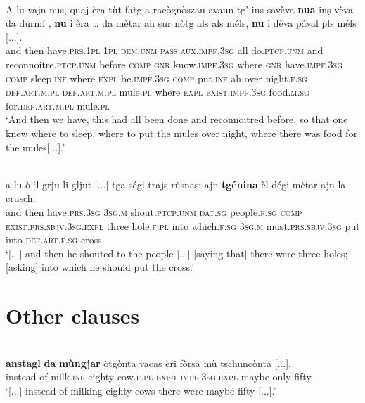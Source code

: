 	
\ea
\label{}
\\
\gll A lu vajn nus, quaj èra tùt fatg a racògnòszau avaun tg’ ins savèva \textbf{nua} inṣ vèva da durmí , \textbf{nu} i èra … da mètar ah ṣur nòtg als als méls, \textbf{nu} i dèva pával pls méls [...]. \\
and then have.\textsc{prs.1pl} \textsc{1pl} \textsc{dem.unm} \textsc{pass.aux.impf.3sg} all do.\textsc{ptcp.unm} and  reconnoitre.\textsc{ptcp.unm} before \textsc{comp} \textsc{gnr}  know.\textsc{impf.3sg} where \textsc{gnr} have.\textsc{impf.3sg} \textsc{comp} sleep.\textsc{inf} where \textsc{expl} be.\textsc{impf.3sg} {} \textsc{comp} put.\textsc{inf} ah over night.\textsc{f.sg} \textsc{def.art.m.pl} \textsc{def.art.m.pl} mule.\textsc{pl} where \textsc{expl} \textsc{exist.impf.3sg} food.\textsc{m.sg} for.\textsc{def.art.m.pl} mule.\textsc{pl}\\
\glt `And then we have, this had all been done and reconnoitred before, so that one knew where to sleep, where to put the mules over night, where there was food for the mules[...].'
\z

\ea
\label{}
 {\citealt[134]{Büchli1966}}\\
\gll [...] a lu ò `l grju li gljut [...] tga ségi trajs rùsnas; ajn \textbf{tgénina} èl dégi mètar ajn la crusch.\\
{} and then have.\textsc{prs.3sg} \textsc{3sg.m} shout.\textsc{ptcp.unm} \textsc{dat.sg} people.\textsc{f.sg} {} \textsc{comp} \textsc{exist.prs.sbjv.3sg.expl} three hole.\textsc{f.pl} into which.\textsc{f.sg} \textsc{3sg.m} must.\textsc{prs.sbjv.3sg} put into \textsc{def.art.f.sg} cross\\
\glt `[...] and then he shouted to the people [...] [saying that] there were three holes; [asking] into which he should put the cross.'
\z



\section{Other clauses}

\ea
\label{}
\\
	\gll [...] \textbf{anstagl} \textbf{da} \textbf{mùngjar} òtgònta vacas èri fòrsa mù tschuncònta [...].\\
 {} instead of milk.\textsc{inf} eighty cow.\textsc{f.pl} \textsc{exist.impf.3sg.expl} maybe only fifty\\
\glt `[...]  instead of milking eighty cows there were maybe fifty [...].'
\z


